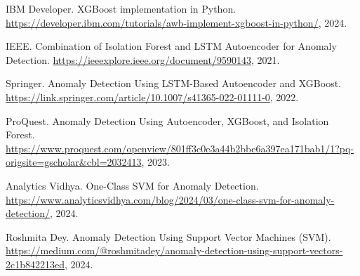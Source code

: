 \documentclass{article}
\begin{document}
\begin{thebibliography}{1}

IBM Developer.
\newblock XGBoost implementation in Python.
\newblock \url{https://developer.ibm.com/tutorials/awb-implement-xgboost-in-python/}, 2024.

IEEE.
\newblock Combination of Isolation Forest and LSTM Autoencoder for Anomaly Detection.
\newblock \url{https://ieeexplore.ieee.org/document/9590143}, 2021.

Springer.
\newblock Anomaly Detection Using LSTM-Based Autoencoder and XGBoost.
\newblock \url{https://link.springer.com/article/10.1007/s41365-022-01111-0}, 2022.

ProQuest.
\newblock Anomaly Detection Using Autoencoder, XGBoost, and Isolation Forest.
\newblock \url{https://www.proquest.com/openview/801ff3c0e3a44b2bbe6a397ea171bab1/1?pq-origsite=gscholar&cbl=2032413}, 2023.

Analytics Vidhya.
\newblock One-Class SVM for Anomaly Detection.
\newblock \url{https://www.analyticsvidhya.com/blog/2024/03/one-class-svm-for-anomaly-detection/}, 2024.

Roshmita Dey.
\newblock Anomaly Detection Using Support Vector Machines (SVM).
\newblock \url{https://medium.com/@roshmitadey/anomaly-detection-using-support-vectors-2c1b842213ed}, 2024.

\end{thebibliography}
\end{document}
